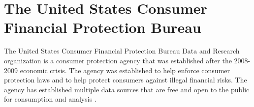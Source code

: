 \section{The United States Consumer Financial Protection Bureau}

The United States Consumer Financial Protection Bureau Data and Research
organization is a consumer protection agency that was established after
the 2008-2009 economic crisis.  The agency was established to help enforce
consumer protection laws and to help protect consumers against illegal
financial risks.  The agency has established multiple data sources that are
free and open to the public for consumption and analysis \cites{CFPB2018}.
